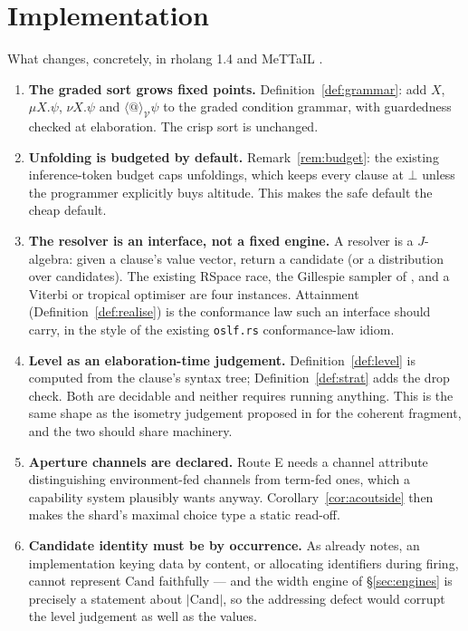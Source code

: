 \documentclass[11pt]{article}
\theoremstyle{definition}
\theoremstyle{plain}
\theoremstyle{remark}
\newcommand{\V}{\mathcal{V}}
\newcommand{\Cand}{\mathrm{Cand}}
\begin{document}
\section{Implementation}\label{sec:impl}

What changes, concretely, in rholang 1.4 and MeTTaIL \cite{omnibus}.

\begin{enumerate}[label=I\arabic*.,leftmargin=2.6em,itemsep=3pt]
\item \textbf{The graded sort grows fixed points.} Definition~\ref{def:grammar}: add
$X$, $\mu X.\psi$, $\nu X.\psi$ and $\langle @ \rangle_\V \psi$ to the graded
condition grammar, with guardedness checked at elaboration. The crisp sort is
unchanged.
\item \textbf{Unfolding is budgeted by default.} Remark~\ref{rem:budget}: the existing
inference-token budget caps unfoldings, which keeps every clause at $\bot$ unless the
programmer explicitly buys altitude. This makes the safe default the cheap default.
\item \textbf{The resolver is an interface, not a fixed engine.} A resolver is a
$J$-algebra: given a clause's value vector, return a candidate (or a distribution over
candidates). The existing RSpace race, the Gillespie sampler of \cite{weightedgslt},
and a Viterbi or tropical optimiser are four instances. Attainment
(Definition~\ref{def:realise}) is the conformance law such an interface should carry,
in the style of the existing \texttt{oslf.rs} conformance-law idiom.
\item \textbf{Level as an elaboration-time judgement.} Definition~\ref{def:level} is
computed from the clause's syntax tree; Definition~\ref{def:strat} adds the drop check.
Both are decidable and neither requires running anything. This is the same shape as the
isometry judgement proposed in \cite{gradedwhere} for the coherent fragment, and the two
should share machinery.
\item \textbf{Aperture channels are declared.} Route E needs a channel attribute
distinguishing environment-fed channels from term-fed ones, which a capability
system plausibly wants anyway. Corollary~\ref{cor:acoutside} then makes the shard's maximal
choice type a static read-off.
\item \textbf{Candidate identity must be by occurrence.} As \cite{gradedwhere} already
notes, an implementation keying data by content, or allocating identifiers during
firing, cannot represent $\Cand$ faithfully --- and the width engine of
\S\ref{sec:engines} is precisely a statement about $|\Cand|$, so the addressing defect
would corrupt the level judgement as well as the values.
\end{enumerate}
\end{document}
